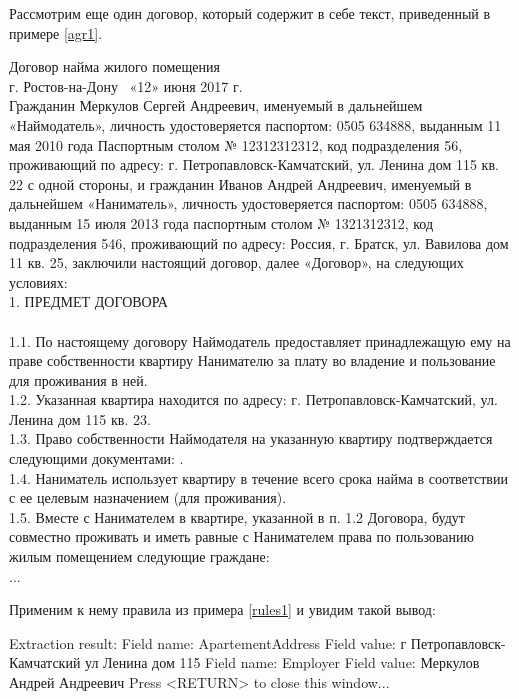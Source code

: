 Рассмотрим еще один договор, который содержит в себе текст, приведенный в примере \ref{agr1}.
\begin{myexample}
\label{agr1}
Договор найма жилого помещения\\

г. Ростов-на-Дону \                                                        «12» июня 2017 г.\\

     Гражданин Меркулов Сергей Андреевич, именуемый в дальнейшем «Наймодатель»,  личность  удостоверяется  паспортом: 0505  634888, выданным 11 мая 2010 года Паспортным столом № 12312312312, код подразделения 56, проживающий по адресу: г. Петропавловск-Камчатский, ул. Ленина дом 115 кв. 22 с одной стороны, и гражданин Иванов Андрей Андреевич, именуемый в дальнейшем «Наниматель»,  личность  удостоверяется  паспортом:   0505  634888,  выданным 15 июля 2013 года паспортным столом № 1321312312, код подразделения 546, проживающий по адресу: Россия, г. Братск, ул. Вавилова дом 11 кв. 25, заключили настоящий договор, далее «Договор»,  на следующих условиях:\\

1. ПРЕДМЕТ ДОГОВОРА\\
\\
1.1. По настоящему договору Наймодатель предоставляет принадлежащую ему на праве собственности квартиру Нанимателю за плату во владение и пользование для проживания в ней.\\
1.2. Указанная квартира находится по адресу: г. Петропавловск-Камчатский, ул. Ленина дом 115 кв. 23.\\
1.3. Право собственности Наймодателя на указанную квартиру подтверждается следующими документами: .\\
1.4. Наниматель использует квартиру в течение всего срока найма в соответствии с ее целевым назначением (для проживания).\\
1.5. Вместе с Нанимателем в квартире, указанной в п. 1.2 Договора, будут совместно проживать и иметь равные с Нанимателем права по пользованию жилым помещением следующие граждане:\\
...
\end{myexample}
Применим к нему правила из примера \ref{rules1} и увидим такой вывод:
\begin{Verb}
Extraction result:
Field name: ApartementAddress
Field value: г Петропавловск-Камчатский ул Ленина дом 115 
Field name: Employer
Field value: Меркулов Андрей Андреевич 
Press <RETURN> to close this window...
\end{Verb}

